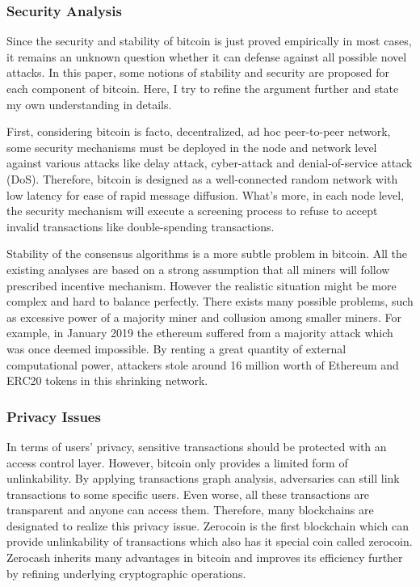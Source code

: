 \documentclass[conference]{IEEEtran}
\begin{document}
\subsubsection{Security Analysis}
Since the security and stability of bitcoin is just proved empirically in most cases, it remains an unknown question whether it can defense against all possible novel attacks.
%
In this paper, some notions of stability and security are proposed for each component of bitcoin. Here, I try to refine the argument further and state my own understanding in details.

First, considering bitcoin is facto, decentralized, ad hoc peer-to-peer network, some security mechanisms must be deployed in the node and network level against various attacks like delay attack, cyber-attack and denial-of-service attack (DoS).
%
Therefore, bitcoin is designed as a well-connected random network with low latency for ease of rapid message diffusion. 
%
What's more, in each node level, the security mechanism will execute a screening process to refuse to accept invalid transactions like double-spending transactions.

Stability of the consensus algorithms is a more subtle problem in bitcoin.
%
All the existing analyses are based on a strong assumption that all miners will follow prescribed incentive mechanism.
%
However the realistic situation might be more complex and hard to balance perfectly.
%
There exists many possible problems, such as excessive power of a majority miner and collusion among smaller miners.
%
For example, in January 2019 the ethereum\cite{wood2014ethereum} suffered from a majority attack which was once deemed impossible.
%
By renting a great quantity of external computational power, attackers stole around 16 million worth of Ethereum and ERC20 tokens in this shrinking network.

\subsubsection{Privacy Issues}
In terms of users' privacy, sensitive transactions should be protected with an access control layer. 
%
However, bitcoin only provides a limited form of unlinkability.
%
By applying transactions graph analysis, adversaries can still link transactions to some specific users.
%
Even worse, all these transactions are transparent and anyone can access them.
%
Therefore, many blockchains are designated to realize this privacy issue. 
%
Zerocoin\cite{miers2013zerocoin} is the first blockchain which can provide unlinkability of transactions which also has it special coin called zerocoin.
%
Zerocash\cite{sasson2014zerocash} inherits many advantages in bitcoin and improves its efficiency further by refining underlying cryptographic operations.
\end{document}
